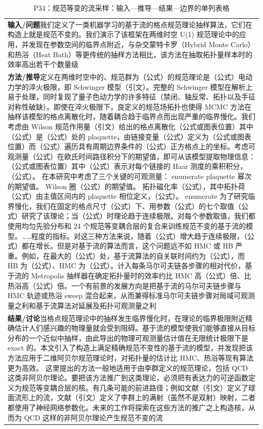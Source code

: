 \documentclass[UTF8,11pt,oneside]{ctexbook}
\begin{document}
\begin{table}[htbp]
  \centering
  \caption*{P34：规范等变的流采样：输入—推导—结果—边界的单列表格}
  \small
  \begin{tabular}{@{}p{}@{}}
    \toprule
    \textbf{输入/问题}\quad 我们定义了一类机器学习的基于流的格点规范理论抽样算法，它们在构造上就是规范不变的。我们演示了该框架在两维时空 U(1) 规范理论中的应用，并发现在参数空间的临界点附近，与杂交蒙特卡罗（Hybrid Monte Carlo）和热浴（Heat Bath）等更传统的抽样方法相比，该方法在抽取拓扑量样本时的效率高出若干个数量级 \\
    \textbf{方法/推导}\quad 定义在两维时空中的、规范群为（公式）的规范理论是（公式）电动力学的淬火极限，即 Schwinger 模型（引文）。完整的 Schwinger 模型在解析上易于处理，同时复现了量子色动力学的许多特征（禁闭、轴反常、拓扑以及手征对称性破缺）。即使在淬火极限下，良定义的规范场拓扑也使得 MCMC 方法在抽样该模型的格点离散化时，随着耦合趋于临界点而出现严重的临界慢化。我们考虑由 Wilson 规范作用量（引文）给出的格点离散化（公式或图表位置）其中（公式）是（公式）处的 plaquette，由链接变量（公式）定义为（公式或图表位置）而（公式）遍历具有周期边界条件的（公式）正方格点上的坐标。考虑可观测量（公式）在欧氏时间路径积分下的期望值，即可从该模型提取物理信息：（公式或图表位置）其中（公式）表示对每个链接的 Haar 测度的乘积积分，（公式）。 在本研究中考虑了三个关键的可观测量： enumerate plaquette 幂次的期望值。 Wilson 圈（公式）的期望值。 拓扑磁化率（公式），其中拓扑荷（公式）由主值区间内的 plaquette 相位定义，（公式）。 enumerate 为了研究临界慢化，我们在固定的格点尺寸（公式）下、用参数（公式）的七个取值（公式）研究了该理论；当（公式）时理论趋于连续极限。对每个参数取值，我们都使用均匀先验分布和 24 个规范等变耦合层的复合来训练规范不变的基于流的模型。……程度的指标。对这三种方法来说，随着（公式）增大趋于连续极限，（公式）都在增长。但是对基于流的算法而言，这个问题远不如 HMC 或 HB 严重。例如，在最大的（公式）处，基于流算法的自关联时间约为（公式），而 HB 为（公式）、HMC 为（公式）。计入每条马尔可夫链各步骤的相对代价，基于流的 Metropolis 抽样器在确定拓扑量时的效率约比 HMC 高（公式）倍、比热浴高（公式）倍。一个有前景的发展方向是把基于流的马尔可夫链步骤与 HMC 轨迹或热浴 sweep 混合起来，从而兼得标准马尔可夫链步骤对局域可观测量之利和基于流算法对延展及拓扑可观测量之利 \\
    \textbf{结果/讨论}\quad 当格点规范理论中的抽样发生临界慢化时，在理论的临界极限附近精确估计人们感兴趣的物理量就会受到阻碍。基于流的模型使我们能够直接从目标分布的一个近似中抽样，由此导出的物理可观测量估计值在无限统计极限下是 exact 的。本文引入了构造上满足精确规范不变性的基于流的模型，并发现把该方法应用于二维阿贝尔规范理论时，对拓扑量的估计比 HMC、热浴等现有算法更为高效。 这里提出的方法一般地适用于由李群定义的规范理论，包括 QCD 这类非阿贝尔理论。要把该方法推广到这类理论，必须把有表达力的可逆函数定义为规范等变耦合层的核。有几条可能的前进路径；例如文献（引文）定义了球面流形上的流，文献（引文）定义了李群上的满射（虽然不是双射）映射，二者都使用了神经网络参数化。未来的工作将探索在这些方法的推广之上构造核，从而为 QCD 这样的非阿贝尔理论产生规范不变的流 \\

\end{tabular}
\end{table}
\end{document}
